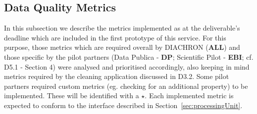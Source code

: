 
\subsection{Data Quality Metrics}
\label{sec:DQMetrics} 



In this subsection we describe the metrics implemented as at the deliverable's deadline which are included in the first prototype of this service.
For this purpose, those metrics which are required overall by DIACHRON (\textbf{ALL}) and those specific by the pilot partners (Data Publica - \textbf{DP};  Scientific Pilot - \textbf{EBI}; cf. D5.1 - Section 4) were analysed and prioritised accordingly, also keeping in mind metrics required by the cleaning application discussed in D3.2.
Some pilot partners required custom metrics (eg. checking for an additional property) to be implemented.
These will be identified with a $\star$.
Each implemented metric is expected to conform to the interface described in Section~\ref{sec:processingUnit}.






